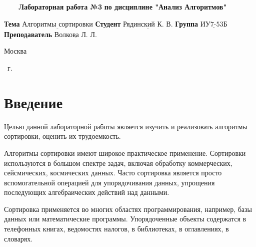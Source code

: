 \documentclass[a4paper,14pt, unknownkeysallowed]{extreport}
\begin{document}
\begin{center}
	\noindent\begin{minipage}{1.3\textwidth}\centering
	\Large\textbf{   ~~~ Лабораторная работа №3}\newline
	\textbf{по дисциплине "Анализ Алгоритмов"}\newline\newline\newline
	\end{minipage}
\end{center}

\noindent\textbf{Тема} $\underline{\text{Алгоритмы сортировки}}$\newline\newline
\noindent\textbf{Студент} $\underline{\text{Рядинский К. В.}}$\newline\newline
\noindent\textbf{Группа} $\underline{\text{ИУ7-53Б}}$\newline\newline
\noindent\textbf{Преподаватель} $\underline{\text{Волкова Л. Л.}}$\newline

\begin{center}
	\mbox{}
	\vfill
	Москва
\end{center}

\begin{center}
	\the\year ~г.
\end{center}
\clearpage


\tableofcontents
\newpage

\chapter*{Введение}


Целью данной лабораторной работы является изучить и реализовать алгоритмы сортировки, оценить их трудоемкость.

Алгоритмы сортировки имеют широкое практическое применение. Сортировки используются в большом спектре задач, включая обработку коммерческих, сейсмических, космических данных. Часто сортировка является просто вспомогательной операцией для упорядочивания данных, упрощения последующих алгебраических действий над данными.


Сортировка применяется во многих областях программирования, например, базы данных или математические программы. Упорядоченные объекты содержатся в телефонных книгах, ведомостях налогов, в библиотеках, в оглавлениях, в словарях.
\end{document}
